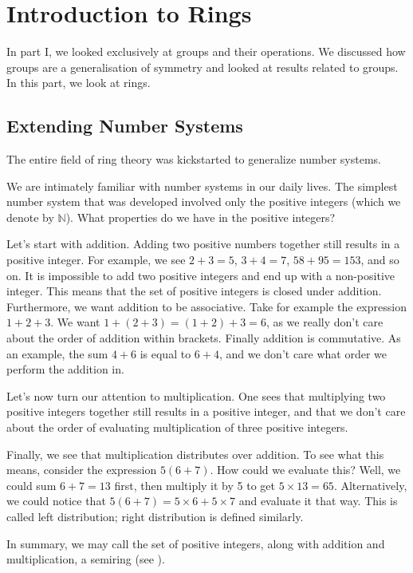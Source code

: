 \chapter{Introduction to Rings}
In part I, we looked exclusively at groups and their operations. We discussed how groups are a generalisation of symmetry and looked at results related to groups. In this part, we look at rings.

\section{Extending Number Systems}
The entire field of ring theory was kickstarted to generalize number systems.

We are intimately familiar with number systems in our daily lives. The simplest number system that was developed involved only the positive integers (which we denote by $\mathbb{N}$). What properties do we have in the positive integers?

Let's start with addition. Adding two positive numbers together still results in a positive integer. For example, we see $2 + 3 = 5$, $3 + 4 = 7$, $58 + 95 = 153$, and so on. It is impossible to add two positive integers and end up with a non-positive integer. This means that the set of positive integers is closed under addition. Furthermore, we want addition to be associative. Take for example the expression $1 + 2 + 3$. We want $1 + (2 + 3) = (1 + 2) + 3 = 6$, as we really don't care about the order of addition within brackets. Finally addition is commutative. As an example, the sum $4 + 6$ is equal to $6 + 4$, and we don't care what order we perform the addition in.

Let's now turn our attention to multiplication. One sees that multiplying two positive integers together still results in a positive integer, and that we don't care about the order of evaluating multiplication of three positive integers.

Finally, we see that multiplication distributes over addition. To see what this means, consider the expression $5(6+7)$. How could we evaluate this? Well, we could sum $6+7 = 13$ first, then multiply it by 5 to get $5\times13 = 65$. Alternatively, we could notice that $5(6+7) = 5 \times 6 + 5 \times 7$ and evaluate it that way. This is called left distribution; right distribution is defined similarly.

In summary, we may call the set of positive integers, along with addition and multiplication, a semiring (see \cite{mathworld_semiring-definition}).

